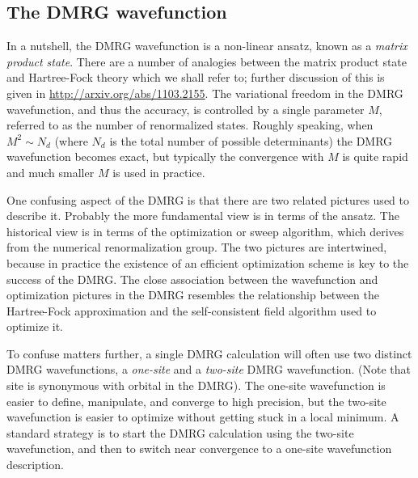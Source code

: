 \documentclass[letterpaper,12pt,aps, pra]{revtex4-1}
\begin{document}
\subsection{The DMRG wavefunction}

In a nutshell, the DMRG wavefunction is a non-linear ansatz, known as a {\it matrix product state}.
There are a number of analogies between the matrix product state and Hartree-Fock theory which
we shall refer to; further discussion of this is given in \url{http://arxiv.org/abs/1103.2155}.
 The variational freedom in the DMRG wavefunction, and thus the accuracy, is controlled by a single parameter $M$, referred
to as the number of renormalized states.
Roughly speaking, when $M^2 \sim N_d$ (where $N_d$ is the total number
of possible determinants) the DMRG wavefunction becomes exact, but typically the convergence with $M$
is quite rapid and much smaller $M$ is used in practice. 

One confusing aspect of the DMRG is that there are two related
pictures used to describe it. Probably the more fundamental view is in
terms of the ansatz.
The historical view is in terms of the optimization or sweep algorithm,
 which derives from the numerical renormalization group.
The two pictures are intertwined, because
in practice the existence of an efficient optimization scheme is
key to the success of the DMRG. The close association between the wavefunction and optimization pictures in the DMRG
resembles the relationship between the Hartree-Fock approximation and the
self-consistent field algorithm used to optimize it.

To confuse matters further, a single DMRG calculation will often use two distinct DMRG wavefunctions, a {\it one-site} and a {\it two-site}
DMRG wavefunction. (Note that site is synonymous with orbital in the DMRG). The one-site
 wavefunction is easier to define, manipulate, and converge to high precision, but the two-site wavefunction is
easier to optimize without getting stuck in a local minimum. A standard strategy is 
to start the DMRG calculation using the two-site wavefunction, and then to switch near convergence to a 
one-site wavefunction description.
\end{document}
